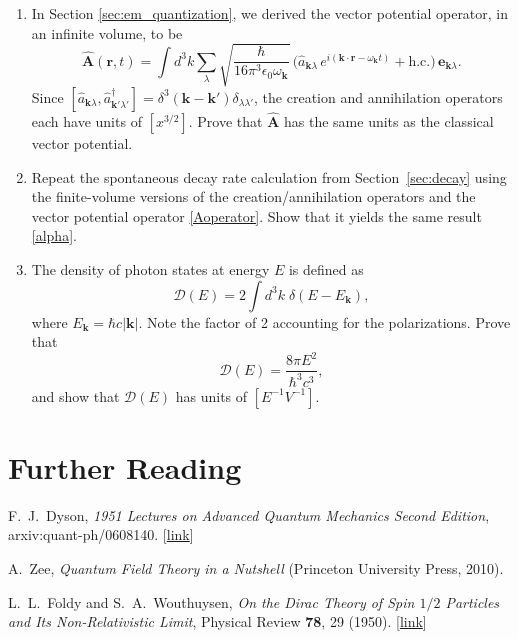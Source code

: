 \documentclass[pra,12pt]{revtex4}
\begin{document}
\begin{enumerate}
\item
  In Section \ref{sec:em_quantization}, we derived the vector
  potential operator, in an infinite volume, to be
  \begin{equation}
    \hat{\mathbf{A}}(\mathbf{r},t) = \int d^3k \sum_{\lambda} 
  \sqrt{\frac{\hbar}{16\pi^3\epsilon_0\omega_{\mathbf{k}}}}\,
  \Big(\hat{a}_{\mathbf{k}\lambda} \, e^{i(\mathbf{k}\cdot\mathbf{r} - \omega_{\mathbf{k}} t)}
  + \mathrm{h.c.}\Big)\, \mathbf{e}_{\mathbf{k}\lambda}.
  \end{equation}
  Since $[\hat{a}_{\mathbf{k}\lambda},
    \hat{a}^\dagger_{\mathbf{k}'\lambda'}] =
  \delta^3(\mathbf{k}-\mathbf{k}') \delta_{\lambda\lambda'}$, the
  creation and annihilation operators each have units of $[x^{3/2}]$.
  Prove that $\hat{\mathbf{A}}$ has the same units as the classical
  vector potential.

\item Repeat the spontaneous decay rate calculation from
  Section~\ref{sec:decay} using the finite-volume versions of the
  creation/annihilation operators and the vector potential operator
  \eqref{Aoperator}.  Show that it yields the same result
  \eqref{alpha}.
  \label{ex:alpha_finite}

\item
  The density of photon states at energy $E$ is defined as
  \begin{equation}
    \mathcal{D}(E) = 2\int d^3k\; \delta(E-E_{\mathbf{k}}),
  \end{equation}
  where $E_{\mathbf{k}} = \hbar c |\mathbf{k}|$.  Note the factor of 2
  accounting for the polarizations.  Prove that
  \begin{equation}
    \mathcal{D}(E) = \frac{8\pi E^2}{\hbar^3c^3},
  \end{equation}
  and show that $\mathcal{D}(E)$ has units of $[E^{-1}V^{-1}]$.
  \label{ex:DE}

\end{enumerate}

\section*{Further Reading}

\begin{enumerate}[[1{]}]
\item F.~J.~Dyson, \textit{1951 Lectures on Advanced Quantum Mechanics
  Second Edition}, arxiv:quant-ph/0608140. [\href{https://arxiv.org/abs/quant-ph/0608140}{link}]
\label{cite:dyson}

\item A.~Zee, \textit{Quantum Field Theory in a Nutshell} (Princeton
  University Press, 2010).
\label{cite:zee}

\item L.~L.~Foldy and S.~A.~Wouthuysen, \textit{On the Dirac Theory of
  Spin $1/2$ Particles and Its Non-Relativistic Limit}, Physical
  Review \textbf{78}, 29 (1950). [\href{https://journals.aps.org/pr/abstract/10.1103/PhysRev.78.29}{link}]
\label{cite:foldy}
\end{enumerate}
\end{document}

